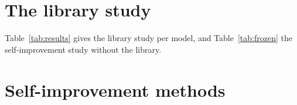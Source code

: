 \section{The library study}
\label{app:pfix}

Table~\ref{tab:results} gives the library study per model, and Table~\ref{tab:frozen} the
self-improvement study without the library.

\begin{figure}[!htb]
\centering

\caption{\EpisodeCaption}
\label{fig:episode}
\end{figure}



\begin{table}[!htb]
\centering\scriptsize\setlength{\tabcolsep}{2pt}

\caption{Valid episodes per model and arm, of \FixEpisodesPerArm{} ($^\ast$: core model). Rt.:
F4 episodes in which \texttt{route()} named the task's rule. No library: the earlier study of
\S\ref{sec:study}, judged with three checks.}
\label{tab:results}
\end{table}




\begin{table}[!htb]
\centering\scriptsize\setlength{\tabcolsep}{4pt}

\caption{The self-improvement methods without the library, judged with three checks: valid
episodes of \FixEpisodesPerArm{} per core model. Every gain over
\texttt{NoImprove} comes from the two models that \texttt{NoImprove} already solved sometimes.
Over all \StudyModels{} models and \FrozenArm{} episodes per arm, \texttt{Repeat} was valid in
\FrozenRepeat, \texttt{Check} in \FrozenCheck{} and \texttt{Explain} in \FrozenExplain.}
\label{tab:frozen}
\end{table}

\section{Self-improvement methods}
\label{app:methods}

